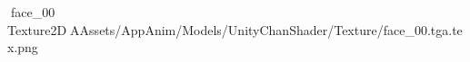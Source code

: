    face_00            	   Texture2D   A   Assets/AppAnim/Models/UnityChanShader/Texture/face_00.tga.tex.png